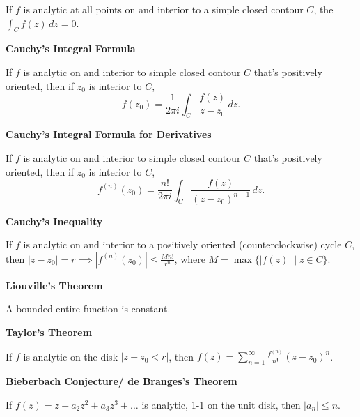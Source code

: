 \documentclass{article}
\begin{document}
    If $f$ is analytic at all points on and interior to a simple closed contour $C$, the  $\int_Cf(z)\,dz=0$.

\medskip\noindent\textbf{Cauchy's Integral Formula}

    If $f$ is analytic on and interior to simple closed contour $C$ that's positively oriented, then if $z_0$ is interior to $C$, $$f(z_0) = \frac1{2\pi i}\int_C\frac{f(z)}{z-z_0}\,dz.$$

\medskip\noindent\textbf{Cauchy's Integral Formula for Derivatives}

    If $f$ is analytic on and interior to simple closed contour $C$ that's positively oriented, then if $z_0$ is interior to $C$, $$f^{(n)}(z_0) = \frac{n!}{2\pi i}\int_C\frac{f(z)}{(z-z_0)^{n+1}}\,dz.$$

\medskip\noindent\textbf{Cauchy's Inequality}

    If $f$ is analytic on and interior to a positively oriented (counterclockwise) cycle $C$, then $|z-z_0| = r \implies |f^{(n)}(z_0)| \leq \frac{Mn!}{r^n}$, where $M = \max\{|f(z)| \mid z \in C\}$.

\medskip\noindent\textbf{Liouville's Theorem}

    A bounded entire function is constant.

\medskip\noindent\textbf{Taylor's Theorem}

    If $f$ is analytic on the disk $|z-z_0 < r|$, then $f(z) = \sum_{n=1}^\infty\frac{f^{(n)}}{n!}(z-z_0)^n$.

\medskip\noindent\textbf{Bieberbach Conjecture/ de Branges's Theorem}

    If $f(z) = z + a_2z^2 + a_3z^3 + \hdots$ is analytic, 1-1 on the unit disk, then $|a_n| \leq n$.
\end{document}
